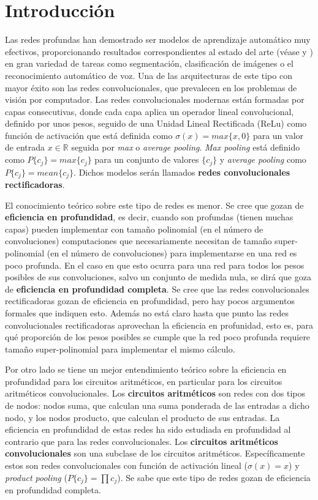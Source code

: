 \chapter{Introducción}	

Las redes profundas han demostrado ser modelos de aprendizaje automático muy efectivos, proporcionando resultados correspondientes al estado del arte (véase \cite{Goodfellow-et-al-2016} y \cite{LeCun-Yann-Bengio}) en gran variedad de tareas como segmentación, clasificación de imágenes o el reconocimiento automático de voz. Una de las arquitecturas de este tipo con mayor éxito son las redes convolucionales, que prevalecen en los problemas de visión por computador. Las redes convolucionales modernas están formadas por capas consecutivas, donde cada capa aplica un operador lineal convolucional, definido por unos pesos, seguido de una Unidad Lineal Rectificada (ReLu) como función de activación que está definida como $\sigma(x) = max\{x,0\}$ para un valor de entrada $x \in 
\mathbb{R}$ seguida por \textit{max} o \textit{average pooling}. \textit{Max pooling} está definido como $P\{c_j\}=max\{c_j\}$ para un conjunto de valores $\{c_j\}$ y \textit{average pooling} como $P\{c_j\}=mean\{c_j\}$. Dichos modelos serán llamados \textbf{redes convolucionales rectificadoras}. 

El conocimiento teórico sobre este tipo de redes es menor. Se cree que gozan de \textbf{eficiencia en profundidad}, es decir, cuando son profundas (tienen muchas capas) pueden implementar con tamaño polinomial (en el número de convoluciones) computaciones que necesariamente necesitan de tamaño super-polinomial (en el número de convoluciones) para implementarse en una red es poco profunda. En el caso en que esto ocurra para una red para todos los pesos posibles de sus convoluciones, salvo un conjunto de medida nula, se dirá que goza de \textbf{eficiencia en profundidad completa}. Se cree que las redes convolucionales rectificadoras gozan de eficiencia en profundidad, pero hay pocos argumentos formales que indiquen esto. Además no está claro hasta que punto las redes convolucionales rectificadoras aprovechan la eficiencia en profunidad, esto es, para qué proporción de los pesos posibles se cumple que la red poco profunda requiere tamaño super-polinomial para implementar el mismo cálculo.


Por otro lado se tiene un mejor entendimiento teórico sobre la eficiencia en profundidad para los circuitos aritméticos, en particular para los circuitos aritméticos convolucionales. Los \textbf{circuitos aritméticos} son redes con dos tipos de nodos: nodos suma, que calculan una suma ponderada de las entradas a dicho nodo, y los nodos producto, que calculan el producto de sus entradas. La eficiencia en profundidad de estas redes ha sido estudiada en profundidad al contrario que para las redes convolucionales. Los \textbf{circuitos aritméticos convolucionales} son una subclase de los circuitos aritméticos. Específicamente estos son redes convolucionales con función de activación lineal ($\sigma(x) = x$) y \textit{product pooling} ($P\{c_j\} = \prod c_j$). Se sabe que este tipo de redes gozan de eficiencia en profundidad completa.

